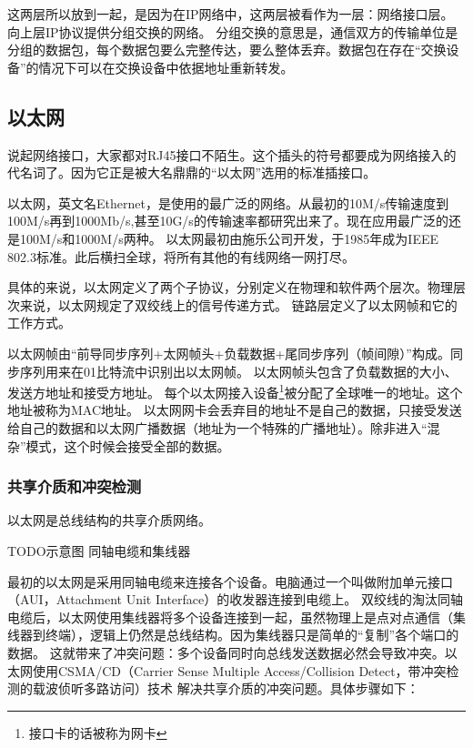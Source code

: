 这两层所以放到一起，是因为在IP网络中，这两层被看作为一层：网络接口层。向上层IP协议提供分组交换的网络。
分组交换的意思是，通信双方的传输单位是分组的数据包，每个数据包要么完整传达，要么整体丢弃。数据包在存在“交换设备”的情况下可以在交换设备中依据地址重新转发。

\subsection{以太网}

说起网络接口，大家都对RJ45接口不陌生。这个插头的符号都要成为网络接入的代名词了。因为它正是被大名鼎鼎的“以太网”选用的标准插接口。



以太网，英文名Ethernet，是使用的最广泛的网络。从最初的10M/s传输速度到100M/s再到1000Mb/s,甚至10G/s的传输速率都研究出来了。现在应用最广泛的还是100M/s和1000M/s两种。
以太网最初由施乐公司开发，于1985年成为IEEE 802.3标准。此后横扫全球，将所有其他的有线网络一网打尽。

具体的来说，以太网定义了两个子协议，分别定义在物理和软件两个层次。物理层次来说，以太网规定了双绞线上的信号传递方式。%
链路层定义了以太网帧和它的工作方式。

以太网帧由“前导同步序列+太网帧头+负载数据+尾同步序列（帧间隙）”构成。同步序列用来在01比特流中识别出以太网帧。
以太网帧头包含了负载数据的大小、发送方地址和接受方地址。
每个以太网接入设备\footnote{接口卡的话被称为网卡}被分配了全球唯一的地址。这个地址被称为MAC地址。
以太网网卡会丢弃目的地址不是自己的数据，只接受发送给自己的数据和以太网广播数据（地址为一个特殊的广播地址）。除非进入“混杂”模式，这个时候会接受全部的数据。

\subsubsection{共享介质和冲突检测}

以太网是总线结构的共享介质网络。

TODO示意图 同轴电缆和集线器 %

最初的以太网是采用同轴电缆来连接各个设备。电脑通过一个叫做附加单元接口（AUI，Attachment Unit Interface）的收发器连接到电缆上。
双绞线的淘汰同轴电缆后，以太网使用集线器将多个设备连接到一起，虽然物理上是点对点通信（集线器到终端），逻辑上仍然是总线结构。因为集线器只是简单的“复制”各个端口的数据。
这就带来了冲突问题：多个设备同时向总线发送数据必然会导致冲突。以太网使用CSMA/CD（Carrier Sense Multiple Access/Collision Detect，带冲突检测的载波侦听多路访问）技术
解决共享介质的冲突问题。具体步骤如下：

